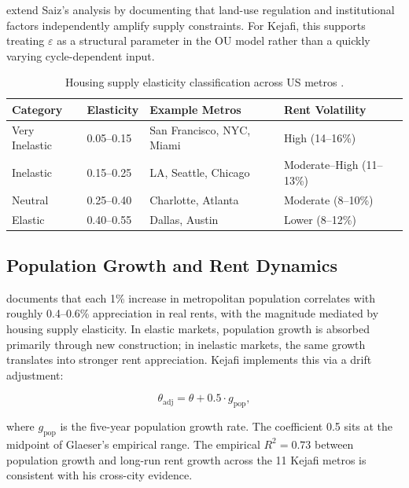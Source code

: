 \documentclass[11pt,letterpaper]{article}
\begin{document}
\citet{gyourko2015} extend Saiz's analysis by documenting that land-use regulation and
institutional factors independently amplify supply constraints. For Kejafi, this supports
treating $\varepsilon$ as a structural parameter in the OU model rather than a quickly
varying cycle-dependent input.

\begin{table}[H]
\centering
\caption{Housing supply elasticity classification across US metros \citep{saiz2010,gyourko2015}.}
\label{tab:elasticity}
\begin{tabular}{llll}
\toprule
\textbf{Category} & \textbf{Elasticity} & \textbf{Example Metros} & \textbf{Rent Volatility} \\
\midrule
Very Inelastic & 0.05--0.15 & San Francisco, NYC, Miami & High (14--16\%) \\
Inelastic      & 0.15--0.25 & LA, Seattle, Chicago      & Moderate--High (11--13\%) \\
Neutral        & 0.25--0.40 & Charlotte, Atlanta        & Moderate (8--10\%) \\
Elastic        & 0.40--0.55 & Dallas, Austin            & Lower (8--12\%) \\
\bottomrule
\end{tabular}
\end{table}

\subsection{Population Growth and Rent Dynamics}

\citet{glaeser2018} documents that each 1\% increase in metropolitan population correlates
with roughly 0.4--0.6\% appreciation in real rents, with the magnitude mediated by housing
supply elasticity. In elastic markets, population growth is absorbed primarily through new
construction; in inelastic markets, the same growth translates into stronger rent
appreciation. Kejafi implements this via a drift adjustment:
\begin{eqbox}
\begin{equation}
\theta_{\text{adj}} = \theta + 0.5 \cdot g_{\text{pop}},
\label{eq:theta_adj}
\end{equation}
\end{eqbox}
where $g_{\text{pop}}$ is the five-year population growth rate. The coefficient 0.5 sits at
the midpoint of Glaeser's empirical range. The empirical $R^2 = 0.73$ between population
growth and long-run rent growth across the 11 Kejafi metros is consistent with his
cross-city evidence.
\end{document}
